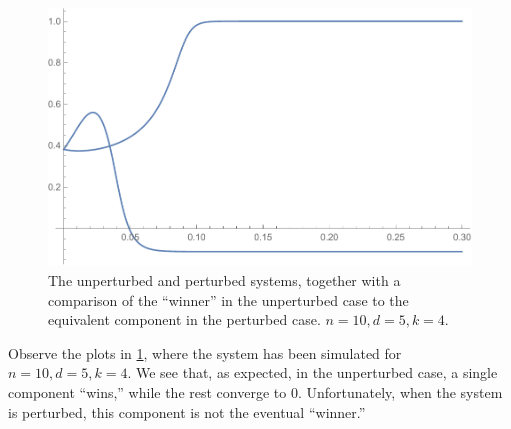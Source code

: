 \documentclass{hw-scrartcl}
\begin{document}
\begin{figure}[p]
  \includegraphics[width=\linewidth*2/3]{perturbation-analysis-failure/max-comparison.pdf}
  \caption{The unperturbed and perturbed systems, together with a comparison of the ``winner'' in the unperturbed case to the equivalent component in the perturbed case. \(n = 10, d=5, k=4.\)}
  \label{fig:perturbation-failure}
\end{figure}
Observe the plots in \cref{fig:perturbation-failure}, where the system has been simulated for \(n = 10, d=5, k=4\). We see that, as expected, in the unperturbed case, a single component ``wins,'' while the rest converge to \(0\). Unfortunately, when the system is perturbed, this component is not the eventual ``winner.''
\end{document}
